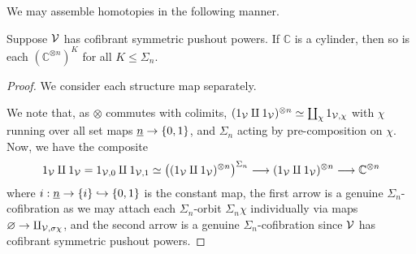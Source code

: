 \documentclass[a4paper,10pt
,draft
]{article}%
\renewcommand{\1}{\eta}%
\begin{document}
We may assemble homotopies in the following manner.

\begin{lemma}
      \label{ASSEM_HOM_LEM}
      Suppose $\mathcal V$ has cofibrant symmetric pushout powers.
      If $\mathbb C$ is a cylinder, then so is each $\left(\mathbb C^{\otimes n}\right)^{K}$ for all $K \leq \Sigma_n$.
\end{lemma}
\begin{proof}
      We consider each structure map separately.
      
      We note that, as $\otimes$ commutes with colimits,
      $(1_{\mathcal V} \amalg 1_{\mathcal V})^{\otimes n} \simeq \coprod_{\chi} 1_{\mathcal V,\chi}$
      with $\chi$ running over all set maps $\underline{n} \to \left\{0,1\right\}$,
      and $\Sigma_n$ acting by pre-composition on $\chi$.
      Now, we have the composite
      \begin{equation}
            1_{\mathcal V} \amalg 1_{\mathcal V} = 1_{\mathcal V, 0} \amalg 1_{\mathcal V, 1}
            \simeq
            \left((1_{\mathcal V} \amalg 1_{\mathcal V})^{\otimes n}\right)^{\Sigma_n}
            \longrightarrow
            (1_{\mathcal V} \amalg 1_{\mathcal V})^{\otimes n}
            \longrightarrow
            \mathbb C^{\otimes n}
      \end{equation}
      where $i: \underline{n} \to \left\{i\right\} \hookrightarrow \left\{0,1\right\}$ is the constant map,
      the first arrow is a genuine $\Sigma_n$-cofibration
      as we may attach each $\Sigma_n$-orbit $\Sigma_n \chi$ individually via maps $\varnothing \to \amalg_{\mathcal V,\sigma\chi}$,
      and the second arrow is a genuine $\Sigma_n$-cofibration since $\mathcal V$ has cofibrant symmetric pushout powers.


\end{proof}
\end{document}
